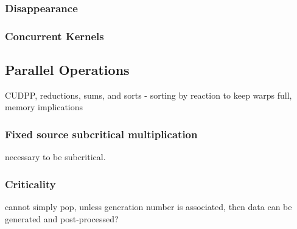 \subsubsection{Disappearance}

\subsubsection{Concurrent Kernels}

\subsection{Parallel Operations}

CUDPP, reductions, sums, and sorts - sorting by reaction to keep warps full, memory implications

\subsubsection{Fixed source subcritical multiplication}

necessary to be subcritical.

\subsubsection{Criticality}

cannot simply pop, unless generation number is associated, then data can be generated and post-processed?





